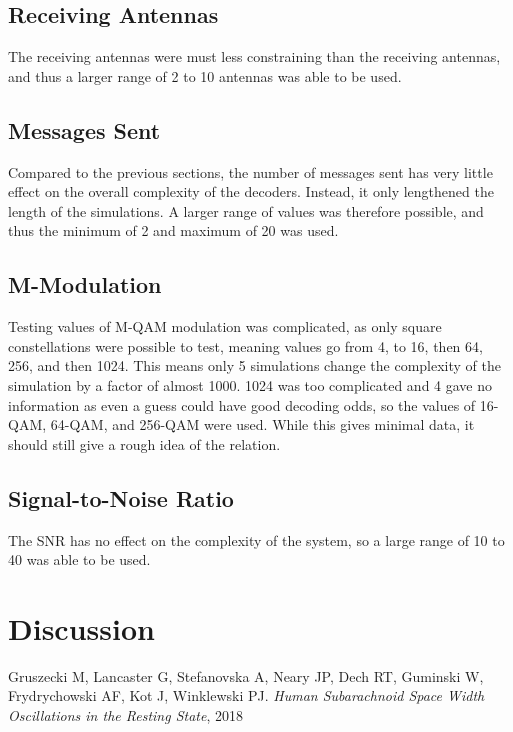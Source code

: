 \documentclass[conference]{IEEEtran}
\begin{document}
\subsection{Receiving Antennas}
The receiving antennas were must less constraining than the receiving antennas, and thus a larger range of 2 to 10 antennas was able to be used.

\subsection{Messages Sent}
Compared to the previous sections, the number of messages sent has very little effect on the overall complexity of the decoders. Instead, it only lengthened the length of the simulations. A larger range of values was therefore possible, and thus the minimum of 2 and maximum of 20 was used.

\subsection{M-Modulation}
Testing values of M-QAM modulation was complicated, as only square constellations were possible to test, meaning values go from 4, to 16, then 64, 256, and then 1024. This means only 5 simulations change the complexity of the simulation by a factor of almost 1000. 1024 was too complicated and 4 gave no information as even a guess could have good decoding odds, so the values of 16-QAM, 64-QAM, and 256-QAM were used. While this gives minimal data, it should still give a rough idea of the relation.

\subsection{Signal-to-Noise Ratio}
The SNR has no effect on the complexity of the system, so a large range of 10 to 40 was able to be used.

\section{Discussion}
\lipsum[10]

\begin{thebibliography}{1}
Gruszecki M, Lancaster G, Stefanovska A, Neary JP, Dech RT, Guminski W, Frydrychowski AF, Kot J, Winklewski PJ. \emph{Human Subarachnoid Space Width Oscillations in the Resting State}, 2018
\end{thebibliography}
\end{document}
